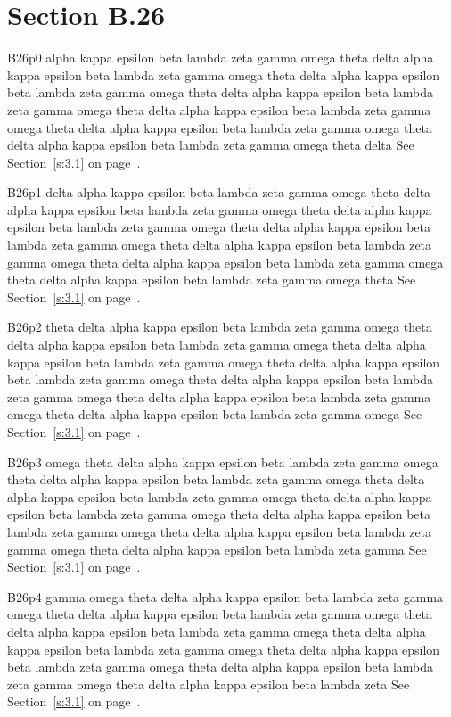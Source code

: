 \section{Section B.26}\label{s:B.26}
B26p0 alpha kappa epsilon beta lambda zeta gamma omega theta delta alpha kappa epsilon beta lambda zeta gamma omega theta delta alpha kappa epsilon beta lambda zeta gamma omega theta delta alpha kappa epsilon beta lambda zeta gamma omega theta delta alpha kappa epsilon beta lambda zeta gamma omega theta delta alpha kappa epsilon beta lambda zeta gamma omega theta delta alpha kappa epsilon beta lambda zeta gamma omega theta delta See Section~\ref{s:3.1} on page~\pageref{s:3.1}.

B26p1 delta alpha kappa epsilon beta lambda zeta gamma omega theta delta alpha kappa epsilon beta lambda zeta gamma omega theta delta alpha kappa epsilon beta lambda zeta gamma omega theta delta alpha kappa epsilon beta lambda zeta gamma omega theta delta alpha kappa epsilon beta lambda zeta gamma omega theta delta alpha kappa epsilon beta lambda zeta gamma omega theta delta alpha kappa epsilon beta lambda zeta gamma omega theta See Section~\ref{s:3.1} on page~\pageref{s:3.1}.

B26p2 theta delta alpha kappa epsilon beta lambda zeta gamma omega theta delta alpha kappa epsilon beta lambda zeta gamma omega theta delta alpha kappa epsilon beta lambda zeta gamma omega theta delta alpha kappa epsilon beta lambda zeta gamma omega theta delta alpha kappa epsilon beta lambda zeta gamma omega theta delta alpha kappa epsilon beta lambda zeta gamma omega theta delta alpha kappa epsilon beta lambda zeta gamma omega See Section~\ref{s:3.1} on page~\pageref{s:3.1}.

B26p3 omega theta delta alpha kappa epsilon beta lambda zeta gamma omega theta delta alpha kappa epsilon beta lambda zeta gamma omega theta delta alpha kappa epsilon beta lambda zeta gamma omega theta delta alpha kappa epsilon beta lambda zeta gamma omega theta delta alpha kappa epsilon beta lambda zeta gamma omega theta delta alpha kappa epsilon beta lambda zeta gamma omega theta delta alpha kappa epsilon beta lambda zeta gamma See Section~\ref{s:3.1} on page~\pageref{s:3.1}.

B26p4 gamma omega theta delta alpha kappa epsilon beta lambda zeta gamma omega theta delta alpha kappa epsilon beta lambda zeta gamma omega theta delta alpha kappa epsilon beta lambda zeta gamma omega theta delta alpha kappa epsilon beta lambda zeta gamma omega theta delta alpha kappa epsilon beta lambda zeta gamma omega theta delta alpha kappa epsilon beta lambda zeta gamma omega theta delta alpha kappa epsilon beta lambda zeta See Section~\ref{s:3.1} on page~\pageref{s:3.1}.

